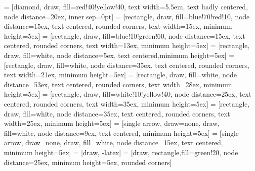 \documentclass[12pt, tikz]{scrreprt}
\begin{document}
 = [diamond, draw, fill=red!40!yellow!40, text width=5.5em, text badly centered, node distance=20ex, inner sep=0pt]
 = [rectangle, draw, fill=blue!70!red!10, node distance=15ex, text centered, rounded corners, text width=15ex, minimum height=5ex]
 = [rectangle, draw, fill=blue!10!green!60, node distance=15ex, text centered, rounded corners, text width=13ex, minimum height=5ex]
 = [rectangle, draw, fill=white, node distance=5ex, text centered,minimum height=5ex]
 = [rectangle, draw, fill=white, node distance=35ex, text centered, rounded corners, text width=21ex, minimum height=5ex]
 = [rectangle, draw, fill=white, node distance=53ex, text centered, rounded corners, text width=28ex, minimum height=5ex]
 = [rectangle, draw, fill=white!10!yellow!40, node distance=25ex, text centered, rounded corners, text width=35ex, minimum height=5ex]
 = [rectangle, draw, fill=white, node distance=35ex, text centered, rounded corners, text width=25ex, minimum height=5ex]
 = [single arrow, draw=none,  draw, fill=white, node distance=9ex, text centered, minimum height=5ex] 
 = [single arrow, draw=none,  draw, fill=white, node distance=15ex, text centered, minimum height=5ex] %
 = [draw, -latex]
 = [draw, rectangle,fill=green!20, node distance=25ex, minimum height=5ex, rounded corners]
\scriptsize
\flushleft
\end{document}
